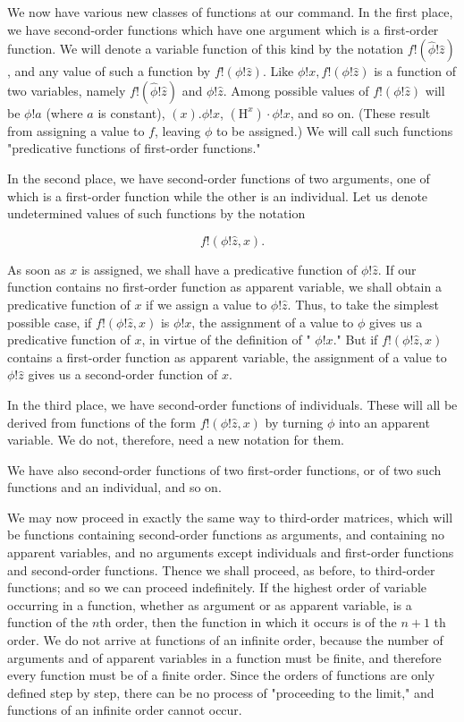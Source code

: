 \documentclass[10pt]{article}
\begin{document}
We now have various new classes of functions at our command. In the first place, we have second-order functions which have one argument which is a first-order function. We will denote a variable function of this kind by the notation $f!(\hat{\phi}!\hat{z})$, and any value of such a function by $f!(\phi!\hat{z})$. Like $\phi!x, f!(\phi!\hat{z})$ is a function of two variables, namely $f!(\hat{\phi}!\hat{z})$ and $\phi!\hat{z}$. Among possible values of $f!(\phi!\hat{z})$ will be $\phi!a$ (where $a$ is constant), $(x) . \phi!x$, $\left(\mathrm{H}^{x}\right) \cdot \phi!x$, and so on. (These result from assigning a value to $f$, leaving $\phi$ to be assigned.) We will call such functions "predicative functions of first-order functions."

In the second place, we have second-order functions of two arguments, one of which is a first-order function while the other is an individual. Let us denote undetermined values of such functions by the notation

$$
f!(\phi!\hat{z}, x) .
$$

As soon as $x$ is assigned, we shall have a predicative function of $\phi!\hat{z}$. If our function contains no first-order function as apparent variable, we shall obtain a predicative function of $x$ if we assign a value to $\phi!\hat{z}$. Thus, to take the simplest possible case, if $f!(\phi!\hat{z}, x)$ is $\phi!x$, the assignment of a value to $\phi$ gives us a predicative function of $x$, in virtue of the definition of " $\phi!x$." But if $f!(\phi!\hat{z}, x)$ contains a first-order function as apparent variable, the assignment of a value to $\phi!\hat{z}$ gives us a second-order function of $x$.

In the third place, we have second-order functions of individuals. These will all be derived from functions of the form $f!(\phi!\hat{z}, x)$ by turning $\phi$ into an apparent variable. We do not, therefore, need a new notation for them.

We have also second-order functions of two first-order functions, or of two such functions and an individual, and so on.

We may now proceed in exactly the same way to third-order matrices, which will be functions containing second-order functions as arguments, and containing no apparent variables, and no arguments except individuals and first-order functions and second-order functions. Thence we shall proceed, as before, to third-order functions; and so we can proceed indefinitely. If the highest order of variable occurring in a function, whether as argument or as apparent variable, is a function of the $n$th order, then the function in which it occurs is of the $n+1$ th order. We do not arrive at functions of an infinite order, because the number of arguments and of apparent variables in a function must be finite, and therefore every function must be of a finite order. Since the orders of functions are only defined step by step, there can be no process of "proceeding to the limit," and functions of an infinite order cannot occur.
\end{document}
